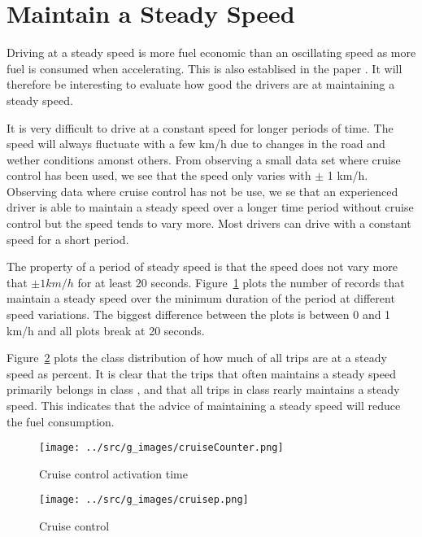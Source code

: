 \section{Maintain a Steady Speed}
Driving at a steady speed is more fuel economic than an oscillating speed as more fuel is consumed when accelerating.
This is also establised in the paper \cite{EcoMark}.
It will therefore be interesting to evaluate how good the drivers are at maintaining a steady speed.

It is very difficult to drive at a constant speed for longer periods of time. 
The speed will always fluctuate with a few km/h due to changes in the road and wether conditions amonst others.
From observing a small data set where cruise control has been used, we see that the speed only varies with $\pm$ 1 km/h. 
Observing data where cruise control has not be use, we se that an experienced driver is able to maintain a steady speed over a longer time period without cruise control but the speed tends to vary more. 
Most drivers can drive with a constant speed for a short period.

The property of a period of steady speed is that the speed does not vary more that $\pm 1km/h$ for at least 20 seconds.
Figure~\ref{fig:cruiseTripsTime} plots the number of records that maintain a steady speed over the minimum duration of the period at different speed variations.
The biggest difference between the plots is between 0 and 1 km/h and all plots break at 20 seconds.%

Figure~\ref{fig:cruiseTrips} plots the class distribution of how much of all trips are at a steady speed as percent.
It is clear that the trips that often maintains a steady speed primarily belongs in class \fuelHigh, and that all trips in class \fuelLow rearly maintains a steady speed.
This indicates that the advice of maintaining a steady speed will reduce the fuel consumption.

\begin{figure}
\centering
\texttt{[image: ../src/g\_images/cruiseCounter.png]}
\caption{Cruise control activation time}
\label{fig:cruiseTripsTime}
\end{figure}

\begin{figure}
\centering
\texttt{[image: ../src/g\_images/cruisep.png]}
\caption{Cruise control}
\label{fig:cruiseTrips}
\end{figure}
